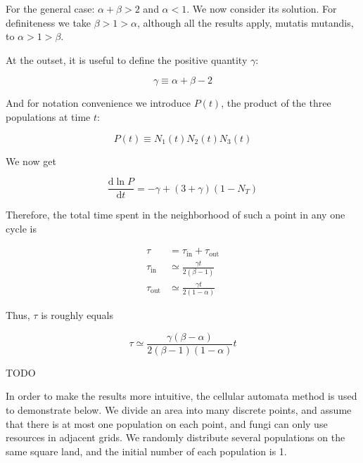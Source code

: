 \documentclass{mcmthesis}
\begin{document}
For the general case: $ \alpha + \beta > 2 $ and $ \alpha < 1 $. We now consider its solution. For definiteness we take $ \beta > 1 > \alpha $, although all the results apply, mutatis mutandis, to $ \alpha > 1 > \beta $.

At the outset, it is useful to define the positive quantity $ \gamma $:

\begin{equation}
  \gamma \equiv \alpha + \beta -2
\end{equation}

And for notation convenience we introduce $ P(t) $, the product of the three populations at time $ t $:

\begin{equation}
  P(t) \equiv N_1(t)N_2(t)N_3(t)
\end{equation}

We now get

\begin{equation}
  \frac{\mathrm{d}{\ln{P}}}{\mathrm{d}t}=-\gamma+(3+\gamma)(1-N_T)
\end{equation}

Therefore, the total time spent in the neighborhood of such a point in any one cycle is

\begin{equation}
  \begin{split}
    \tau &= \tau_{\text{in}}+\tau_{\text{out}} \\
    \tau_{\text{in}}&\simeq \frac{\gamma t}{2(\beta -1)} \\
    \tau_{\text{out}}&\simeq \frac{\gamma t}{2(1-\alpha)}
  \end{split}
\end{equation}

Thus, $ \tau $ is roughly equals

\begin{equation}
  \tau \simeq \frac{\gamma(\beta-\alpha)}{2(\beta-1)(1-\alpha)}t
\end{equation}

TODO


In order to make the results more intuitive, the cellular automata method is used to demonstrate below. We divide an area into many discrete points, and assume that there is at most one population on each point, and fungi can only use resources in adjacent grids. We randomly distribute several populations on the same square land, and the initial number of each population is 1.
\end{document}
